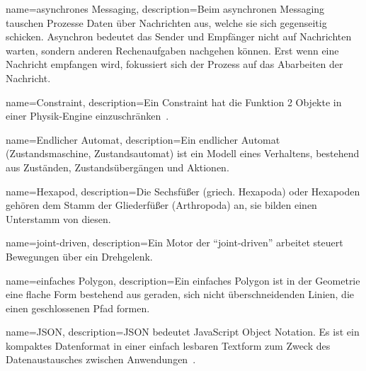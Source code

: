 %
%


%
%

%
%
{
  name={asynchrones Messaging},
  description={Beim asynchronen Messaging tauschen Prozesse Daten über Nachrichten aus,
    welche sie sich gegenseitig schicken.
    Asynchron bedeutet das Sender und Empfänger nicht auf Nachrichten warten,
    sondern anderen Rechenaufgaben nachgehen können.
    Erst wenn eine Nachricht empfangen wird, fokussiert sich der Prozess auf das Abarbeiten der Nachricht.}
}

{
  name={Constraint},
  description={Ein Constraint hat die Funktion 2 Objekte in einer Physik-Engine einzuschränken~\cite{gamedev:constraints}.}
}

{
  name={Endlicher Automat},
  description={Ein endlicher Automat (Zustandsmaschine, Zustandsautomat) ist ein Modell eines Verhaltens,
    bestehend aus Zuständen, Zustandsübergängen und Aktionen.}
}

{
  name={Hexapod},
  description={Die Sechsfüßer (griech. Hexapoda) oder Hexapoden
    gehören dem Stamm der Gliederfüßer (Arthropoda) an,
    sie bilden einen Unterstamm von diesen.}
}

{
  name={joint-driven},
  description={Ein Motor der ``joint-driven'' arbeitet steuert Bewegungen über ein Drehgelenk.}
}

{
  name={einfaches Polygon},
  description={Ein einfaches Polygon ist in der Geometrie eine flache Form bestehend aus geraden,
    sich nicht überschneidenden Linien, die einen geschlossenen Pfad formen.}
}

{
  name={JSON},
  description={JSON bedeutet JavaScript Object Notation.
    Es ist ein kompaktes Datenformat in einer einfach lesbaren Textform
    zum Zweck des Datenaustausches zwischen Anwendungen~\cite{json}.}
}
